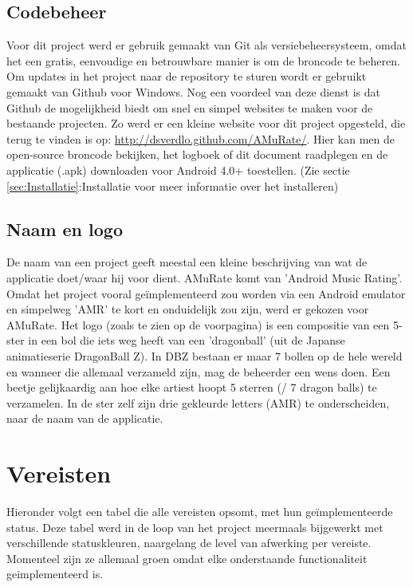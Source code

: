 \documentclass[11pt,a4paper]{article}
\begin{document}
	
	\subsection{Codebeheer}
	\label{sec:Codebeheer}
		Voor dit project werd er gebruik gemaakt van Git als versiebeheersysteem, omdat het een gratis, eenvoudige en betrouwbare manier is om de broncode te beheren. Om updates in het project naar de repository te sturen wordt er gebruikt gemaakt van Github voor Windows. Nog een voordeel van deze dienst is dat Github de mogelijkheid biedt om snel en simpel websites te maken voor de bestaande projecten. Zo werd er een kleine website voor dit project opgesteld, die terug te vinden is op: \url{http://dsverdlo.github.com/AMuRate/}. Hier kan men de open-source broncode bekijken, het logboek of dit document raadplegen en de applicatie (.apk) downloaden voor Android 4.0+ toestellen. (Zie sectie \ref{sec:Installatie}:Installatie voor meer informatie over het installeren)
		
	\subsection{Naam en logo}
	\label{sec:Naam en logo}
		De naam van een project geeft meestal een kleine beschrijving van wat de applicatie doet/waar hij voor dient. AMuRate komt van 'Android Music Rating'. Omdat het project vooral geïmplementeerd zou worden via een Android emulator en simpelweg 'AMR' te kort en onduidelijk zou zijn, werd er gekozen voor AMuRate. Het logo (zoals te zien op de voorpagina) is een compositie van een 5-ster in een bol die iets weg heeft van een 'dragonball' (uit de Japanse animatieserie DragonBall Z). In DBZ bestaan er maar 7 bollen op de hele wereld en wanneer die allemaal verzameld zijn, mag de beheerder een wens doen. Een beetje gelijkaardig aan hoe elke artiest hoopt 5 sterren (/ 7 dragon balls) te verzamelen. 
	In de ster zelf zijn drie gekleurde letters (AMR) te onderscheiden, naar de naam van de applicatie.
	
	
\section{Vereisten}
\label{sec:Vereisten}
Hieronder volgt een tabel die alle vereisten opsomt, met hun geïmplementeerde status. Deze tabel werd in de loop van het project meermaals bijgewerkt met verschillende statuskleuren, naargelang de level van afwerking per vereiste. Momenteel zijn ze allemaal groen omdat elke onderstaande functionaliteit geimplementeerd is.
\end{document}
